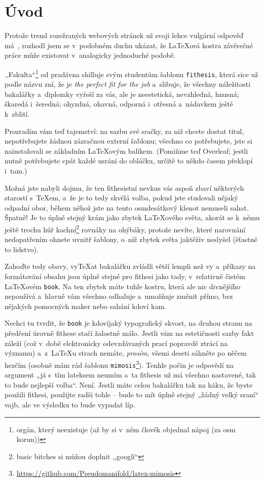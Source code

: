 \chapter{Úvod}

Protože trend rozežraných webových stránek už svoji lehce vulgární odpověď
má~\cite{web:mf}, rozhodl jsem se v~podobném duchu ukázat, že \LaTeX ová kostra
závěrečné práce může existovat v~analogicky jednoduché podobě.

,,Fakulta``\footnote{orgán, který neexistuje (až by si
v~něm člověk objednal nápoj (za osm korun))} od pradávna
shilluje svým studentům šablonu \texttt{fithesis}, která sice už podle názvu
zní, že je \emph{the perfect fit for the job} a~slibuje, že všechny náležitosti
bakalářky a~diplomky vyřeší za vás, ale je neestetická, nevzhledná, hnusná;
škaredá i~šeredná; ohyzdná, ohavná, odporná i~otřesná a~nádavkem ještě k~zblití.

Prozradím vám teď tajemství: na sazbu své sračky, za niž chcete dostat titul,
nepotřebujete žádnou zázračnou externí šablonu; všechno co potřebujete, jste si
nainstalovali se základním \LaTeX ovým balíkem. (Pomiňme teď Overleaf; jestli
nutně potřebujete cpát každé usrání do obláčku, určitě to někdo časem překlopí
i~tam.)

Možná jste nabyli dojmu, že ten fithesistní nevkus vás aspoň zbaví některých
starostí s~\TeX em, a~že je to tedy skvělá volba, pokud jste studovali nějaký
odpadní obor, během něhož jste na tento osmdesátkový klenot nemuseli sahat.
Špatně! Je to úplně stejný krám jako zbytek \LaTeX ového světa, akorát se k~němu
ještě trochu hůř kachní\footnote{basic bitches si můžou doplnit ,,googlí``}
rovnáky na ohýbáky, protože nevíte, které narovnání nedopatřením ohnete uvnitř
šablony, o~níž zbytek světa jaktěživ neslyšel (šťastné to lidstvo).

Zahoďte tedy obavy, vy\TeX at bakalářku zvládli větší lempli než vy a~příkazy na
formátování obsahu jsou úplně stejné pro fithesi jako tady, v~relativně čistém
\LaTeX ovém \texttt{book}. Na ten zbytek máte tuhle kostru, která ale nic
divnějšího nepoužívá a~hlavně vám všechno odhaluje a~umožňuje změnit přímo, bez
nějakých pomocných maker nebo sahání kdoví kam.

Nechci tu tvrdit, že \texttt{book} je kdovíjaký typografický skvost, na druhou
stranu na předčení úrovně fithese stačí žalostně málo. Jestli vám na
estetičnosti sazby fakt záleží (což v~době elektronicky odevzdávaných prací
popravdě ztrácí na významu) a~z~\LaTeX u strach nemáte, \emph{prosím}, všemi
deseti sáhněte po něčem hezčím (osobně mám rád šablonu
\texttt{mimosis}\footnote{\url{https://github.com/Pseudomanifold/latex-mimosis}}).
Tenhle počin je odpovědí na argument „já s~tím lateksem neumím a~ta fithesis už
má všechno nastavené, tak to bude nejlepší volba“. Není. Jestli máte celou
bakalářku tak na háku, že byste použili fithesi, použijte radši tohle -- bude to
mít úplně stejný „žádný velký sraní“ vajb, ale ve výsledku to bude  vypadat líp.
